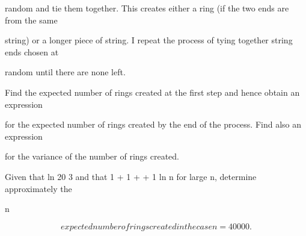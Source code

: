 \documentclass[12pt]{article}
\begin{document}
\begin{flushleft}
random and tie them together. This creates either a ring (if the two ends are from the same\par
string) or a longer piece of string. I repeat the process of tying together string ends chosen at\par
random until there are none left.\par
Find the expected number of rings created at the first step and hence obtain an expression\par
for the expected number of rings created by the end of the process. Find also an expression\par
for the variance of the number of rings created.\par
Given that ln 20 3 and that 1 + 1 + + 1 ln n for large n, determine approximately the\par
{} \cdots n \approx\par
\[expected number of rings created in the case n = 40 000.\]
\par
\end{flushleft}
\end{document}
